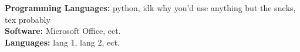 %

\noindent\textbf{Programming Languages:} python, idk why you'd use anything but the sneks, tex probably \\
\noindent\textbf{Software:} Microsoft Office, ect. \\
\noindent\textbf{Languages:} lang 1, lang 2, ect. \\
